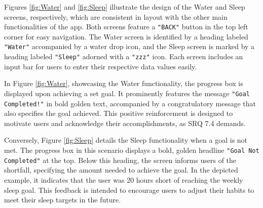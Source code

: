 \documentclass[12pt]{article}
\begin{document}
Figures \ref{fig:Water} and \ref{fig:Sleep} illustrate the design of the Water and Sleep screens,
respectively, which are consistent in layout with the other main functionalities of the app. 
Both screens feature a \texttt{"BACK"} button in the top left corner for easy navigation. The Water 
screen is identified by a heading labeled \texttt{"Water"} accompanied by a water drop icon, and the
Sleep screen is marked by a heading labeled \texttt{"Sleep"} adorned with a \texttt{"zzz"} icon. Each screen 
includes an input bar for users to enter their respective data values easily.\par

In Figure \ref{fig:Water}, showcasing the Water functionality, the progress box is displayed
upon achieving a set goal. It prominently features the message \texttt{"Goal Completed!"} in bold 
golden text, accompanied by a congratulatory message that also specifies the goal achieved.
This positive reinforcement is designed to motivate users and acknowledge their accomplishments, as SRQ 7.4 demands.\par

Conversely, Figure \ref{fig:Sleep} details the Sleep functionality when a goal is not met.
The progress box in this scenario displays a bold, golden headline \texttt{"Goal Not Completed"} at
the top. Below this heading, the screen informs users of the shortfall, specifying the 
amount needed to achieve the goal. In the depicted example, it indicates that the user 
was 20 hours short of reaching the weekly sleep goal. This feedback is intended to 
encourage users to adjust their habits to meet their sleep targets in the future.\par
\end{document}
